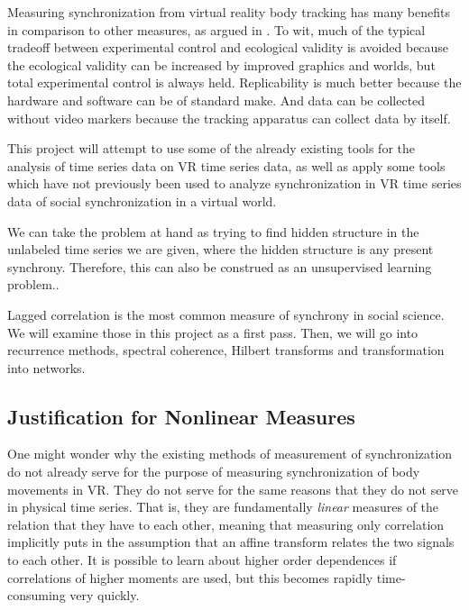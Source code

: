 \documentclass[12pt]{article}
\begin{document}
Measuring synchronization from virtual reality body tracking has many benefits in comparison to other measures, as argued in \cite{blascovich}. To wit, much of the typical tradeoff between experimental control and ecological validity is avoided because the ecological validity can be increased by improved graphics and worlds, but total experimental control is always held. Replicability is much better because the hardware and software can be of standard make. And data can be collected without video markers because the tracking apparatus can collect data by itself. \cite{blascovich}

This project will attempt to use some of the already existing tools for the analysis of time series data on VR time series data, as well as apply some tools which have not previously been used to analyze synchronization in VR time series data of social synchronization in a virtual world.

We can take the problem at hand as trying to find hidden structure in the unlabeled time series we are given, where the hidden structure is any present synchrony. Therefore, this can also be construed as an unsupervised learning problem.\cite{socialsync}.

Lagged correlation is the most common measure of synchrony in social science. We will examine those in this project as a first pass. Then, we will go into recurrence methods, spectral coherence, Hilbert transforms and transformation into networks.

\subsection{Justification for Nonlinear Measures}

One might wonder why the existing methods of measurement of synchronization do not already serve for the purpose of measuring synchronization of body movements in VR. They do not serve for the same reasons that they do not serve in physical time series. That is, they are fundamentally \emph{linear} measures of the relation that they have to each other, meaning that measuring only correlation implicitly puts in the assumption that an affine transform relates the two signals to each other. It is possible to learn about higher order dependences if correlations of higher moments are used, but this becomes rapidly time-consuming very quickly\cite{pompe}.
\end{document}

